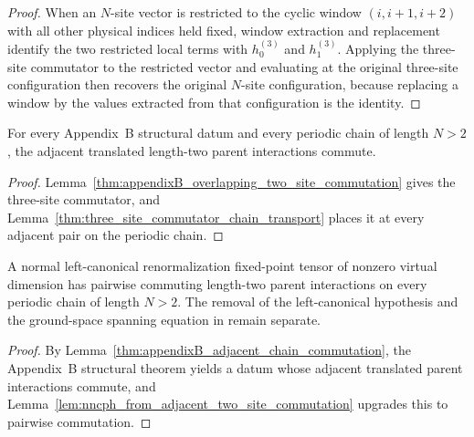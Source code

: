 \begin{proof}
    \leanok
    When an $N$-site vector is restricted to the cyclic window $(i,i+1,i+2)$
    with all other physical indices held fixed, window extraction and
    replacement identify the two restricted local terms with
    $h_0^{(3)}$ and $h_1^{(3)}$. Applying the three-site commutator to the
    restricted vector and evaluating at the original three-site
    configuration then recovers the original $N$-site configuration, because
    replacing a window by the values extracted from that configuration is the
    identity.
\end{proof}

\begin{lemma}
    \label{thm:appendixB_adjacent_chain_commutation}
    \leanok
    For every Appendix~B structural datum and every periodic chain of length
    $N>2$, the adjacent translated length-two parent interactions commute.
\end{lemma}

\begin{proof}
    \leanok
    Lemma~\ref{thm:appendixB_overlapping_two_site_commutation} gives the
    three-site commutator, and
    Lemma~\ref{thm:three_site_commutator_chain_transport} places it at every
    adjacent pair on the periodic chain.
\end{proof}

\begin{lemma}
    \label{thm:left_canonical_rfp_chain_commutation}
    \leanok
    A normal left-canonical renormalization fixed-point tensor of nonzero
    virtual dimension has pairwise
    commuting length-two parent interactions on every periodic chain of length
    $N>2$. The removal of the left-canonical hypothesis and the
    ground-space spanning equation in
    \cite[Definition~3.9]{Cirac2016MPDO_arXiv} remain separate.
\end{lemma}

\begin{proof}
    \leanok
    By Lemma~\ref{thm:appendixB_adjacent_chain_commutation}, the Appendix~B
    structural theorem yields a datum whose adjacent translated parent
    interactions commute, and
    Lemma~\ref{lem:nncph_from_adjacent_two_site_commutation} upgrades this to
    pairwise commutation.
\end{proof}

